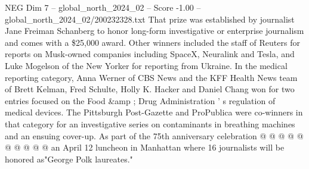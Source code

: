 \begin{textsample}{NEG Dim 7 – global\_north\_2024\_02 – Score -1.00 – global\_north\_2024\_02/200232328.txt}
That prize was established by journalist Jane Freiman Schanberg to honor long-form investigative or enterprise journalism and comes with a \$25,000 award.
Other winners included the staff of Reuters for reports on Musk-owned companies including SpaceX, Neuralink and Tesla, and Luke Mogelson of the New Yorker for reporting from Ukraine.
In the medical reporting category, Anna Werner of CBS News and the KFF Health News team of Brett Kelman, Fred Schulte, Holly K.
Hacker and Daniel Chang won for two entries focused on the Food \&amp ; Drug Administration ' s regulation of medical devices.
The Pittsburgh Post-Gazette and ProPublica were co-winners in that category for an investigative series on contaminants in breathing machines and an ensuing cover-up.
As part of the 75th anniversary celebration @ @ @ @ @ @ @ @ @ @ an April 12 luncheon in Manhattan where 16 journalists will be honored as"George Polk laureates."

\end{textsample}
